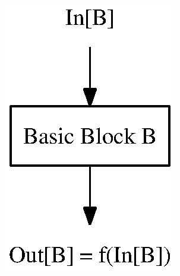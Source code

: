 \begin{figure}
  \centering
  \begin{minipage}[b]{6 cm}
    \includegraphics{grph2_text} 
    \label{labelname 1}
  \end{minipage}
  \begin{minipage}[b]{6 cm}

\end{minipage}
\end{figure}
